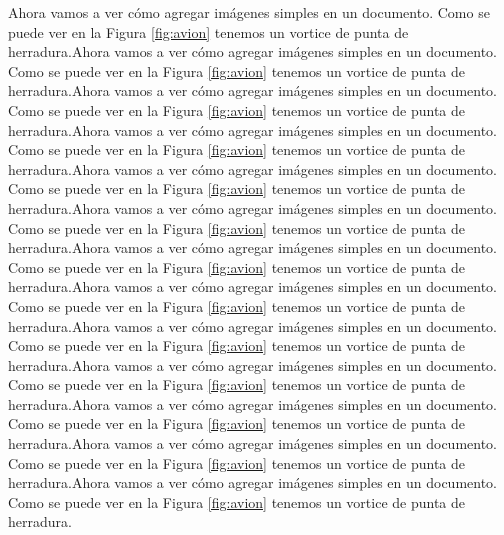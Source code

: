 \documentclass{report}
\begin{document}
Ahora vamos a ver cómo agregar imágenes simples en un documento. Como se puede ver en la Figura \ref{fig:avion} tenemos un vortice de punta de herradura.Ahora vamos a ver cómo agregar imágenes simples en un documento. Como se puede ver en la Figura \ref{fig:avion} tenemos un vortice de punta de herradura.Ahora vamos a ver cómo agregar imágenes simples en un documento. Como se puede ver en la Figura \ref{fig:avion} tenemos un vortice de punta de herradura.Ahora vamos a ver cómo agregar imágenes simples en un documento. Como se puede ver en la Figura \ref{fig:avion} tenemos un vortice de punta de herradura.Ahora vamos a ver cómo agregar imágenes simples en un documento. Como se puede ver en la Figura \ref{fig:avion} tenemos un vortice de punta de herradura.Ahora vamos a ver cómo agregar imágenes simples en un documento. Como se puede ver en la Figura \ref{fig:avion} tenemos un vortice de punta de herradura.Ahora vamos a ver cómo agregar imágenes simples en un documento. Como se puede ver en la Figura \ref{fig:avion} tenemos un vortice de punta de herradura.Ahora vamos a ver cómo agregar imágenes simples en un documento. Como se puede ver en la Figura \ref{fig:avion} tenemos un vortice de punta de herradura.Ahora vamos a ver cómo agregar imágenes simples en un documento. Como se puede ver en la Figura \ref{fig:avion} tenemos un vortice de punta de herradura.Ahora vamos a ver cómo agregar imágenes simples en un documento. Como se puede ver en la Figura \ref{fig:avion} tenemos un vortice de punta de herradura.Ahora vamos a ver cómo agregar imágenes simples en un documento. Como se puede ver en la Figura \ref{fig:avion} tenemos un vortice de punta de herradura.Ahora vamos a ver cómo agregar imágenes simples en un documento. Como se puede ver en la Figura \ref{fig:avion} tenemos un vortice de punta de herradura.Ahora vamos a ver cómo agregar imágenes simples en un documento. Como se puede ver en la Figura \ref{fig:avion} tenemos un vortice de punta de herradura.
\end{document}

